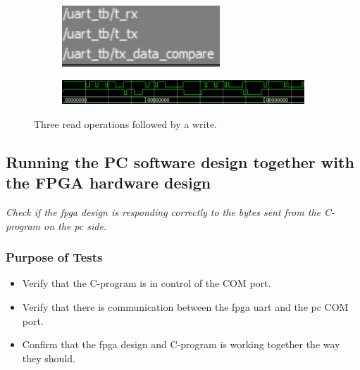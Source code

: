 \documentclass[main.tex]{subfiles}
\begin{document}
\begin{figure}
    \centering
    \begin{subfigure}{0.18\textwidth}
        \centering
        \includegraphics[width=\linewidth]{../img/uart_tb_0}
    \end{subfigure}%
    \begin{subfigure}{0.7\textwidth}
        \centering
        \includegraphics[width=\linewidth]{../img/uart_tb_1}
    \end{subfigure}
    \caption{Three read operations followed by a write. }
    \label{fig:uarttb}
\end{figure}

\subsection{Running the PC software design together with the FPGA hardware design} \label{test:designrun}

\textit{Check if the \gls{fpga} design is responding correctly to the bytes sent from the C-program on the \gls{pc} side.} 

\subsubsection{Purpose of Tests}
\begin{itemize}\setlength{\itemsep}{10pt}
\item Verify that the C-program is in control of the COM port.
\item Verify that there is communication between the \gls{fpga} \gls{uart} and the \gls{pc} COM port.
\item Confirm that the \gls{fpga} design and C-program is working together the way they should.
\end{itemize}
\end{document}
